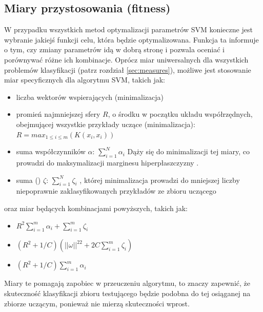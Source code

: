 \subsection{Miary przystosowania (fitness)}
W przypadku wszystkich metod optymalizacji parametrów SVM konieczne jest wybranie jakiejś funkcji celu, która będzie optymalizowana. Funkcja ta informuje o tym, czy zmiany parametrów idą w dobrą stronę i pozwala oceniać i porównywać różne ich kombinacje. Oprócz miar uniwersalnych dla wszystkich problemów klasyfikacji (patrz rozdział \ref{sec:measures}), możliwe jest stosowanie miar specyficznych dla algorytmu SVM, takich jak: \cite{howley_genetic_2005} \cite{runarsson_asynchronous_2004}
\begin{itemize}
	\item liczba wektorów wspierających (minimalizacja)
	\item promień najmniejszej sfery $ R $, o środku w początku układu współrzędnych, obejmującej wszystkie przykłady uczące (minimalizacja):
		$ R = max_{1 \leq i \leq m} (K(x_i, x_i))  $
	\item suma współczynników $ \alpha $: 
	$ \sum_{i=1}^N \alpha_i $
	Dąży się do minimalizacji tej miary, co prowadzi do maksymalizacji marginesu hiperpłaszczyzny \cite{howley_genetic_2005}.
	\item suma  () $ \zeta $:
	 $ \sum_{i=1}^N \zeta_i $
	 , której minimalizacja prowadzi do mniejszej liczby niepoprawnie zaklasyfikowanych przykładów ze zbioru uczącego
\end{itemize}
	oraz miar będących kombinacjami powyższych, takich jak: \cite{runarsson_asynchronous_2004}
\begin{itemize}
	\item $ R^2 \sum_{i=1}^m \alpha_i + \sum_{i=1}^m \zeta_i $
	\item $ (R^2 + 1/C) (||\omega||^22 + 2C \sum_{i=1}^m \zeta_i) $
	\item $ (R^2 + 1/C) \sum_{i=1}^m \alpha_i $
\end{itemize}
Miary te pomagają zapobiec w przeuczeniu algorytmu, to znaczy zapewnić, że skuteczność klasyfikacji zbioru testującego będzie podobna do tej osiąganej na zbiorze uczącym, ponieważ nie mierzą skuteczności wprost. 

